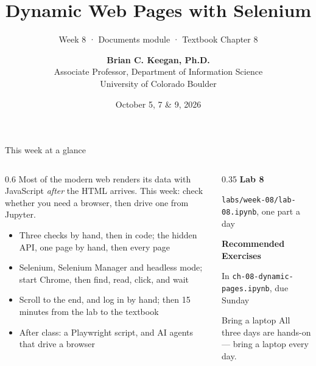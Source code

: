 \documentclass[9pt,aspectratio=169]{beamer}
\title[Week 8 · Dynamic Pages]{{\Huge Dynamic Web Pages with Selenium}}
\subtitle{Week 8 · Documents module · Textbook Chapter 8}
\author[Keegan]{\textbf{Brian C. Keegan, Ph.D.} \\ Associate Professor, Department of Information Science \\ University of Colorado Boulder}
\date{October 5, 7 \& 9, 2026}
\begin{document}
\maketitle

\begin{frame}{This week at a glance}
    \begin{columns}[T]
        \begin{column}{0.6\textwidth}
            Most of the modern web renders its data with JavaScript \textit{after} the HTML arrives. This week: check whether you need a browser, then drive one from Jupyter.

            \bigskip

            \begin{itemize}\small
                \item Three checks by hand, then in code; the hidden API, one page by hand, then every page
            \end{itemize}

            \medskip

            \begin{itemize}\small
                \item Selenium, Selenium Manager and headless mode; start Chrome, then find, read, click, and wait
            \end{itemize}

            \medskip

            \begin{itemize}\small
                \item Scroll to the end, and log in by hand; then 15 minutes from the lab to the textbook
                \item After class: a Playwright script, and AI agents that drive a browser
            \end{itemize}
        \end{column}
        \begin{column}{0.35\textwidth}
            \textbf{Lab 8}\\[2pt]
            {\footnotesize \texttt{labs/week-08/lab-08.ipynb}, one part a day\par}
            \medskip
            \textbf{Recommended Exercises}\\[2pt]
            {\footnotesize In \texttt{ch-08-dynamic-pages.ipynb}, due Sunday\par}
            \medskip
            \begin{alertblock}{Bring a laptop}
                \footnotesize All three days are hands-on --- bring a laptop every day.
            \end{alertblock}
        \end{column}
    \end{columns}
\end{frame}
\end{document}
